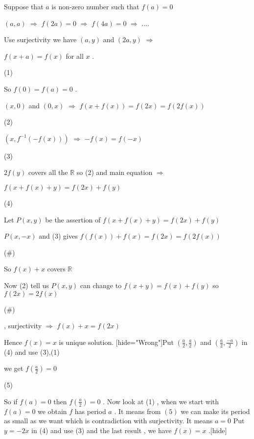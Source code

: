 \begin{solution}
	Suppose that $a$ is non-zero number such that $f(a)=0$ 

$(a,a)$  $\Rightarrow $ $f(2a)=0$ $\Rightarrow$ $f(4a)=0$ $\Rightarrow $ ....

Use surjectivity we have $(a,y)$ and $(2a,y)$ $\Rightarrow$ 

$f(x+a)=f(x)$ for all $x$ . \begin{bolded}(1)\end{bolded}

So $f(0)=f(a)=0$ .

$(x,0)$ and $(0,x)$ $\Rightarrow $  $f(x+f(x)) = f(2x)=f(2f(x))$ \begin{bolded}(2)\end{bolded}

$(x , f^{-1} (-f(x)) )$ $\Rightarrow $ $-f(x)=f(-x)$ \begin{bolded}(3)\end{bolded}
$2f(y)$ covers all the $\mathbb R$ so (2) and main equation $\Rightarrow $

$f(x+f(x) +y)=f(2x)+f(y)$ \begin{bolded}(4)\end{bolded}

Let $P(x,y)$ be the assertion of $ f(x+f(x)+y)=f(2x)+f(y) $ 

$P(x,-x)$ and (3) gives $f(f(x))+f(x)=f(2x)=f(2f(x))$ \begin{bolded}(#) \end{bolded}
So $f(x)+x$ covers $\mathbb R$ 

Now (2) tell us $P(x,y)$ can change to $f(x+y)=f(x)+f(y)$ so $f(2x)=2f(x)$ 

\begin{bolded} (#)\end{bolded} , surjectivity $ \Rightarrow $ $f(x)+x=f(2x)$

Hence $f(x)=x$ is unique solution.
[hide="Wrong"]Put $( \frac{a}{2} , \frac{a}{2} )$  and $( \frac{a}{2} , \frac{-a}{2} )$ in (4) and use (3),(1) 

we get $f(\frac{a}{2})=0$ \begin{bolded}(5)\end{bolded}


So if $f(a)=0$ then $f( \frac{a}{2})=0$ . Now look at (1) , when we start with $f(a)=0$ we obtain $f$ has period $a$ . It means from $(5)$ we can make its period as small as we want which is contradiction with surjectivity.
It means $a=0$
Put $ y=-2x $ in (4) and use (3) and the last result , we have $ f(x)=x $ .[\/hide]
\end{solution}



